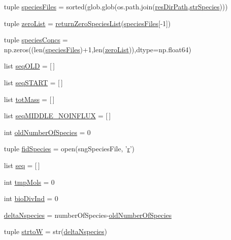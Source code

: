 \begin{DoxyCompactItemize}
\item 
tuple \hyperlink{a00130_af3291bd263282353dd4a12ee38c08cae}{species\-Files} = sorted(glob.\-glob(os.\-path.\-join(\hyperlink{a00130_ab3da7da39258338965b6eef645a913ee}{res\-Dir\-Path},\hyperlink{a00130_ab14d209fe558e83aeede3b657a7241bb}{str\-Species})))
\item 
tuple \hyperlink{a00130_ac2f9e6ead14745bd749a1ab8060cd4e7}{zero\-List} = \hyperlink{a00130_ad7c75c1e146fa51da42274cf7d5747d0}{return\-Zero\-Species\-List}(\hyperlink{a00130_af3291bd263282353dd4a12ee38c08cae}{species\-Files}\mbox{[}-\/1\mbox{]})
\item 
tuple \hyperlink{a00130_a2377568425051a7511b51f7c50662ba1}{species\-Concs} = np.\-zeros((len(\hyperlink{a00130_af3291bd263282353dd4a12ee38c08cae}{species\-Files})+1,len(\hyperlink{a00130_ac2f9e6ead14745bd749a1ab8060cd4e7}{zero\-List})),dtype=np.\-float64)
\item 
list \hyperlink{a00130_a55e3b17fd716a4b1e28e7b9d93f1943c}{seq\-O\-L\-D} = \mbox{[}$\,$\mbox{]}
\item 
list \hyperlink{a00130_a648282264cfc8a40cf84141f9f59781f}{seq\-S\-T\-A\-R\-T} = \mbox{[}$\,$\mbox{]}
\item 
list \hyperlink{a00130_ac2ecae6789d89cc56b0a731065837774}{tot\-Mass} = \mbox{[}$\,$\mbox{]}
\item 
list \hyperlink{a00130_a8fd1a0445b2e641363a96da5a7e7159b}{seq\-M\-I\-D\-D\-L\-E\-\_\-\-N\-O\-I\-N\-F\-L\-U\-X} = \mbox{[}$\,$\mbox{]}
\item 
int \hyperlink{a00130_abe1ce9bb85ee916d2046efc5c3fe6b30}{old\-Number\-Of\-Species} = 0
\item 
tuple \hyperlink{a00130_afd34aa2ef2c410c2d71007bac0a121fd}{fid\-Species} = open(sng\-Species\-File, '\hyperlink{a00031_ac862e7284527eb913b1351c8bfb8e079}{r}')
\item 
list \hyperlink{a00130_a22eec19fcd0da474a136cfe97438ae3b}{seq} = \mbox{[}$\,$\mbox{]}
\item 
int \hyperlink{a00130_aa24f8efad70335a8460f68902001ce64}{tmp\-Mols} = 0
\item 
int \hyperlink{a00130_a247328d05f06695b0c2de9a001ca4548}{bio\-Div\-Ind} = 0
\item 
\hyperlink{a00130_a555117703c3245ec7d3d73f5d991c8c5}{delta\-Nspecies} = number\-Of\-Species-\/\hyperlink{a00130_abe1ce9bb85ee916d2046efc5c3fe6b30}{old\-Number\-Of\-Species}
\item 
tuple \hyperlink{a00130_abe05028c33fab522e3b940195eaaa586}{strto\-W} = str(\hyperlink{a00130_a555117703c3245ec7d3d73f5d991c8c5}{delta\-Nspecies})

\end{DoxyCompactItemize}

